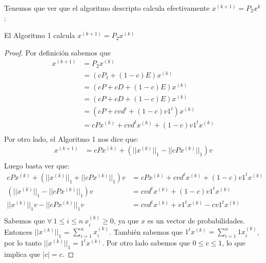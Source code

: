 Tenemos que ver que el algoritmo descripto calcula efectivamente $x^{(k+1)} = P_2x^{k}$:
\begin{proposition}
    El Algoritmo 1 calcula $x^{(k+1)} = P_2x^{(k)}$
\end{proposition}
\begin{proof}
Por definición sabemos que
  \begin{equation*}
            \begin{aligned}
              x^{(k+1)} &= P_2x^{(k)} \\
               &= (cP_1 +(1-c)E)x^{(k)} \\
               &= (cP + cD +(1-c)E)x^{(k)} \\
               &= (cP + cD +(1-c)E)x^{(k)} \\
               &= (cP + cvd^{t} +(1-c)v1^{t})x^{(k)} \\
               &= cPx^{(k)} + cvd^{t}x^{(k)} +(1-c)v1^{t}x^{(k)} \\
            \end{aligned}
\end{equation*}
Por otro lado, el Algoritmo 1 nos dice que:
\begin{equation*}
          \begin{aligned}
            x^{(k+1)} &= cPx^{(k)} + (||x^{(k)}||_1 - ||cPx^{(k)}||_1)v  \\
          \end{aligned}
\end{equation*}
Luego basta ver que:
\begin{equation*}
          \begin{aligned}
            cPx^{(k)} + (||x^{(k)}||_1 + ||cPx^{(k)}||_1)v &= cPx^{(k)} + cvd^{t}x^{(k)} +(1-c)v1^{t}x^{(k)}  \\
            (||x^{(k)}||_1 - ||cPx^{(k)}||_1)v &= cvd^{t}x^{(k)} +(1-c)v1^{t}x^{(k)}  \\
            ||x^{(k)}||_1v - ||cPx^{(k)}||_1v &= cvd^{t}x^{(k)} +v1^{t}x^{(k)} - cv1^{t}x^{(k)}  \\
          \end{aligned}
\end{equation*}
Sabemos que $\forall\ 1\leq i\leq n\ x^{(k)}_{i} \geq 0$, ya que $x$ es un vector de probabilidades. Entonces $||x^{(k)}||_1$ = $\sum\limits_{i=1}^{n}{x^{(k)}_{i}}$. También sabemos que $1^{t}x^{(k)} = \sum\limits_{i=1}^{n}{1x^{(k)}_{i}}$, por lo tanto
$||x^{(k)}||_1 = 1^{t}x^{(k)}$.
\newline
Por otro lado sabemos que $0\leq c\leq 1$, lo que implica que $|c| = c$.

\end{proof}
